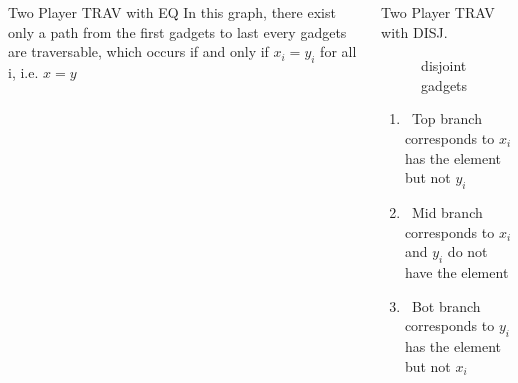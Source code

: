 \documentclass[final]{beamer}
\newlength{\onecolwid}
\newlength{\twocolwid}
\begin{document}
\begin{frame}[t]
\begin{columns}[t]
\begin{column}{\twocolwid}
\begin{columns}[t,totalwidth=\twocolwid]
\begin{column}{\onecolwid}
\begin{block}{Two Player TRAV with EQ}
In this graph, there exist only a path from the first gadgets to last every gadgets are traversable, which occurs if and only if $x_i=y_i$ for all i, i.e. $x=y$ 


\end{block}


\end{column} %

\begin{column}{\onecolwid}\vspace{-.6in} %


\begin{block}{Two Player TRAV with DISJ.}

\begin{figure}[H]
\centering
{}
\caption{disjoint gadgets}
\label{fig:equality-gadget-chain}
\end{figure}

\begin{enumerate}
    \item \ Top branch corresponds to $x_i$ has the element but not $y_i$ 
    \item \ Mid branch corresponds to $x_i$ and $y_i$ do not have the element
    \item \ Bot branch corresponds to $y_i$ has the element but not $x_i$ 
\end{enumerate}


\end{block}
\end{column}
\end{columns}
\end{column}
\end{columns}
\end{frame}
\end{document}
